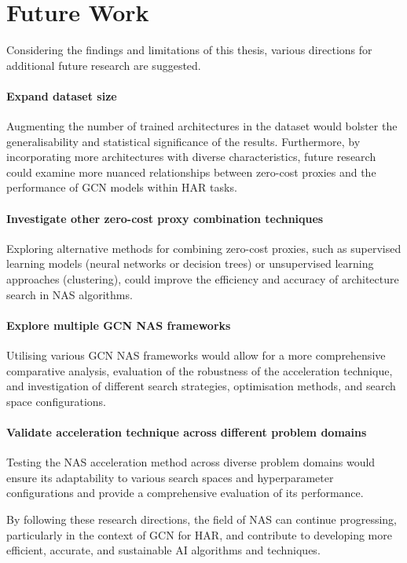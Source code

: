 \section{Future Work}

Considering the findings and limitations of this thesis, various directions for additional future research are suggested.

\paragraph{Expand dataset size}
Augmenting the number of trained architectures in the dataset would bolster the generalisability and statistical significance of the results. Furthermore, by incorporating more architectures with diverse characteristics, future research could examine more nuanced relationships between zero-cost proxies and the performance of \gls{GCN} models within \gls{HAR} tasks.

\paragraph{Investigate other zero-cost proxy combination techniques}
Exploring alternative methods for combining zero-cost proxies, such as supervised learning models (neural networks or decision trees) or unsupervised learning approaches (clustering), could improve the efficiency and accuracy of architecture search in \gls{NAS} algorithms.

\paragraph{Explore multiple GCN NAS frameworks}
Utilising various \gls{GCN} \gls{NAS} frameworks would allow for a more comprehensive comparative analysis, evaluation of the robustness of the acceleration technique, and investigation of different search strategies, optimisation methods, and search space configurations.

\paragraph{Validate acceleration technique across different problem domains}
Testing the \gls{NAS} acceleration method across diverse problem domains would ensure its adaptability to various search spaces and hyperparameter configurations and provide a comprehensive evaluation of its performance.

By following these research directions, the field of \gls{NAS} can continue progressing, particularly in the context of \gls{GCN} for \gls{HAR}, and contribute to developing more efficient, accurate, and sustainable AI algorithms and techniques.

